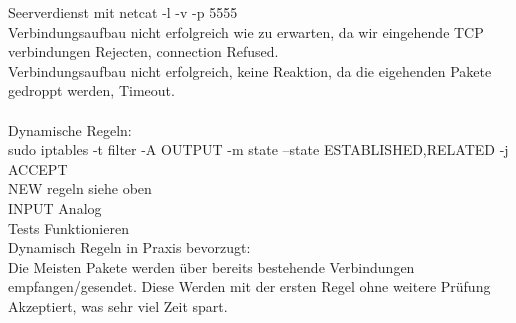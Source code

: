 \documentclass[12pt]{article}
\theoremstyle{plain}
\begin{document}
Seerverdienst mit netcat -l -v -p 5555\\
Verbindungsaufbau nicht erfolgreich wie zu erwarten, da wir eingehende TCP verbindungen Rejecten, connection Refused.\\
Verbindungsaufbau nicht erfolgreich, keine Reaktion, da die eigehenden Pakete gedroppt werden, Timeout.\\
\\
Dynamische Regeln:\\
sudo iptables -t filter -A OUTPUT -m state --state ESTABLISHED,RELATED -j ACCEPT\\
NEW regeln siehe oben\\
INPUT Analog\\
Tests Funktionieren\\
Dynamisch  Regeln in Praxis bevorzugt:\\
Die Meisten Pakete werden über bereits bestehende Verbindungen empfangen/gesendet. Diese Werden mit der ersten Regel ohne weitere Prüfung Akzeptiert, was sehr viel Zeit spart.
\end{document}
